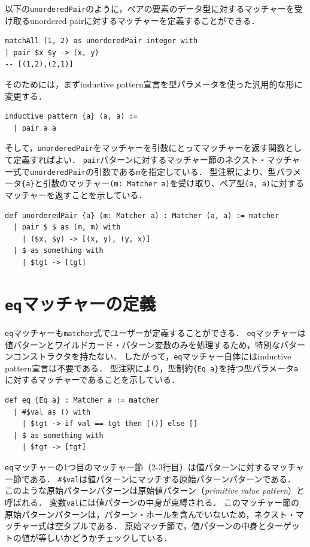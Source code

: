 以下の\lstinline{unorderedPair}のように，ペアの要素のデータ型に対するマッチャーを受け取るunordered pairに対するマッチャーを定義することができる．
\begin{lstlisting}[language=egison,numbers=none]
matchAll (1, 2) as unorderedPair integer with
| pair $x $y -> (x, y)
-- [(1,2),(2,1)]
\end{lstlisting}
そのためには，まずinductive pattern宣言を型パラメータを使った汎用的な形に変更する．
\begin{lstlisting}[language=egison,numbers=none]
inductive pattern {a} (a, a) :=
  | pair a a
\end{lstlisting}
そして，\lstinline{unorderedPair}をマッチャーを引数にとってマッチャーを返す関数として定義すればよい．
\lstinline{pair}パターンに対するマッチャー節のネクスト・マッチャー式で\lstinline{unorderedPair}の引数である\lstinline{m}を指定している．
型注釈により、型パラメータ\lstinline|{a}|と引数のマッチャー\lstinline|(m: Matcher a)|を受け取り、ペア型\lstinline|(a, a)|に対するマッチャーを返すことを示している．
\begin{lstlisting}[language=egison,numbers=none]
def unorderedPair {a} (m: Matcher a) : Matcher (a, a) := matcher
  | pair $ $ as (m, m) with
    | ($x, $y) -> [(x, y), (y, x)]
  | $ as something with
    | $tgt -> [tgt]
\end{lstlisting}

\section{\texttt{eq}マッチャーの定義}\label{matcher-eq}

\lstinline{eq}マッチャーも\lstinline{matcher}式でユーザーが定義することができる．
\lstinline{eq}マッチャーは値パターンとワイルドカード・パターン変数のみを処理するため，特別なパターンコンストラクタを持たない．
したがって，\lstinline{eq}マッチャー自体にはinductive pattern宣言は不要である．
型注釈により，型制約\lstinline|{Eq a}|を持つ型パラメータ\lstinline{a}に対するマッチャーであることを示している．
\begin{lstlisting}[language=egison]
def eq {Eq a} : Matcher a := matcher
  | #$val as () with
    | $tgt -> if val == tgt then [()] else []
  | $ as something with
    | $tgt -> [tgt]
\end{lstlisting}
\lstinline{eq}マッチャーの1つ目のマッチャー節（2-3行目）は値パターンに対するマッチャー節である．
\lstinline{#$val}は値パターンにマッチする原始パターンパターンである．
このような原始パターンパターンは原始値パターン（\emph{primitive value pattern}）と呼ばれる．
変数\lstinline{val}には値パターンの中身が束縛される．
このマッチャー節の原始パターンパターンは，パターン・ホールを含んでいないため，ネクスト・マッチャー式は空タプルである．
原始マッチ節で，値パターンの中身とターゲットの値が等しいかどうかチェックしている．

